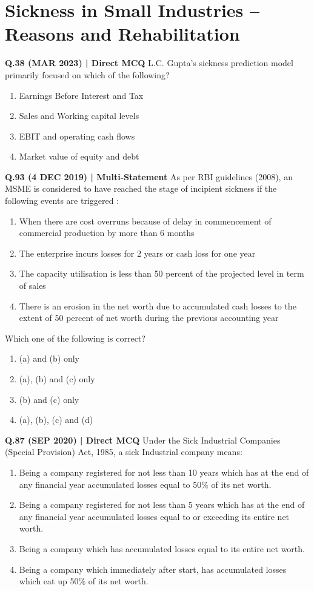 \documentclass{article}
\begin{document}
\section{Sickness in Small Industries – Reasons and Rehabilitation}

\textbf{Q.38 (MAR 2023) | Direct MCQ}
L.C. Gupta's sickness prediction model primarily focused on which of the following?
\begin{enumerate}[label=(\arabic*)]
    \item Earnings Before Interest and Tax
    \item Sales and Working capital levels
    \item EBIT and operating cash flows
    \item Market value of equity and debt
\end{enumerate}

\textbf{Q.93 (4 DEC 2019) | Multi-Statement}
As per RBI guidelines (2008), an MSME is considered to have reached the stage of incipient sickness if the following events are triggered :
\begin{enumerate}[label=(\alph*)]
    \item When there are cost overruns because of delay in commencement of commercial production by more than 6 months
    \item The enterprise incurs losses for 2 years or cash loss for one year
    \item The capacity utilisation is less than 50 percent of the projected level in term of sales
    \item There is an erosion in the net worth due to accumulated cash losses to the extent of 50 percent of net worth during the previous accounting year
\end{enumerate}
Which one of the following is correct?
\begin{enumerate}[label=(\arabic*)]
    \item (a) and (b) only
    \item (a), (b) and (c) only
    \item (b) and (c) only
    \item (a), (b), (c) and (d)
\end{enumerate}

\textbf{Q.87 (SEP 2020) | Direct MCQ}
Under the Sick Industrial Companies (Special Provision) Act, 1985, a sick Industrial company means:
\begin{enumerate}[label=(\arabic*)]
    \item Being a company registered for not less than 10 years which has at the end of any financial year accumulated losses equal to 50\% of its net worth.
    \item Being a company registered for not less than 5 years which has at the end of any financial year accumulated losses equal to or exceeding its entire net worth.
    \item Being a company which has accumulated losses equal to its entire net worth.
    \item Being a company which immediately after start, has accumulated losses which eat up 50\% of its net worth.
\end{enumerate}
\end{document}
